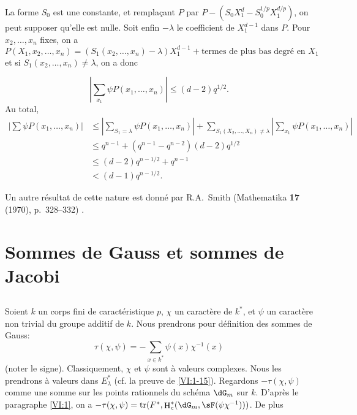 \documentclass[oneside]{book}
\DeclareMathOperator{\h}{H}
\DeclareMathOperator{\tr}{tr}
\theoremstyle{sga-source}
\theoremstyle{sga-source-dash}
\theoremstyle{sga-source-dotdash}
\theoremstyle{sga-source-number-note-dash}
\theoremstyle{sga-source-note-number-dotdash}
\theoremstyle{sga-source-example-dotdash}
\theoremstyle{sga-source-inline-number}
\theoremstyle{sga-source-bare-number}
\theoremstyle{sga-source}
\newcommand{\PrintPage}[1]{}\newcommand{\MathPage}[1]{}\newcommand{\PrintCite}[2]{#1}\newcommand{\var}[3]{#2}
\begin{document}
La forme $S_0$ est une constante, et remplaçant $P$ par 
$P-(S_0 X_1^d -S_0^{1/p} X_1^{d/p})$, on peut supposer qu'elle est nulle. Soit 
enfin $-\lambda$ le coefficient de $X_1^{d-1}$ dans $P$. Pour $x_2,\dots,x_n$ 
fixes, on a 
\[
  P(X_1,x_2,\dots,x_n) = (S_1(x_2,\dots,x_n)-\lambda) X_1^{d-1} + \text{termes de plus bas degré en $X_1$} 
\]
et si $S_1(x_2,\dots,x_n)\ne \lambda$, on a donc 
\PrintPage{195}
\[
  \left| \sum_{x_1} \psi P(x_1,\dots,x_n)\right| \leqslant (d-2) q^{1/2} \text{.} 
\]
Au total, 
\begin{align*}
  \left|\sum \psi P(x_1,\dots,x_n)\right| 
    &\leqslant \var{\left.}{\left|}{S45-SOL-0794}\var{\sum_{S=\lambda}}{\sum_{S_1=\lambda}}{S45-SOL-0795} \psi P(x_1,\dots,x_n)\right| + \var{\sum_{S(X_2,\dots,X_n)\ne\lambda}}{\sum_{S_1(X_2,\dots,X_n)\ne\lambda}}{S45-SOL-0796} \left| \sum_{x_1} \psi P(x_1,\dots,x_n)\right| \\
    &\leqslant q^{n-1} + (q^{n-1}-q^{n-2})(d-2) q^{1/2} \\
    &\var{< (d-2) q^{n-1/2} + q^{n-1}}{\leqslant (d-2) q^{n-1/2} + q^{n-1}}{S45-SOL-0797} \\
    &< (d-1) q^{n-1/2} \text{.}
\end{align*}

Un autre résultat de cette nature est donné par R.A.\ Smith 
(Mathematika \textbf{17} (1970), p.~328--332) \cite{sm70}. 










\PrintPage{196}
\section{Sommes de Gauss et sommes de Jacobi}\label{VI:4}





\subsection{}\label{VI:4-1}

Soient $k$ un corps fini de caractéristique $p$, $\chi$ un caractère de 
$k^\ast$, et $\psi$ un caractère non trivial du groupe additif de $k$. Nous 
prendrons pour définition des sommes de Gauss: 
\begin{equation*}\tag{4.1.1}\label{VI:eq:4-1-1}
  \tau(\chi,\psi) = -\sum_{x\in k^\ast} \psi(x) \chi^{-1}(x) 
\end{equation*}
(noter le signe). Classiquement, $\chi$ et $\psi$ sont à valeurs complexes. 
Nous les prendrons à valeurs dans $E_\lambda^\ast$ (cf. la preuve de 
\ref{VI:1-15}). Regardons $-\tau(\chi,\psi)$ comme une somme sur les points 
rationnels du schéma $\dG_m$ sur $k$. D'après le paragraphe \ref{VI:1}, 
on a $-\tau(\chi,\psi) = \var{\tr(F^\ast,\h_c^\ast(\dG_m,\sF(\psi \chi^{-1}))}{\tr(F^\ast,\h_c^\ast(\dG_m,\sF(\psi \chi^{-1})))}{S45-SOL-0799}$. De 
plus 
\end{document}
